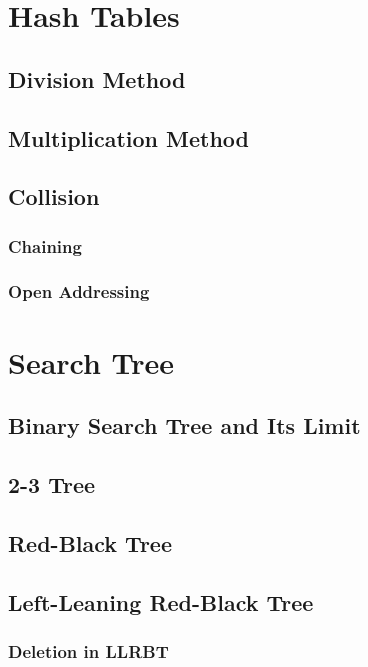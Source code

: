 \documentclass{report}
\begin{document}
\chapter{Hash Tables}

\section{Division Method}

\section{Multiplication Method}

\section{Collision}

\subsection{Chaining}

\subsection{Open Addressing}


\chapter{Search Tree}

\section{Binary Search Tree and Its Limit}

\section{2-3 Tree}

\section{Red-Black Tree}

\section{Left-Leaning Red-Black Tree}

\subsection{Deletion in LLRBT}
\end{document}
